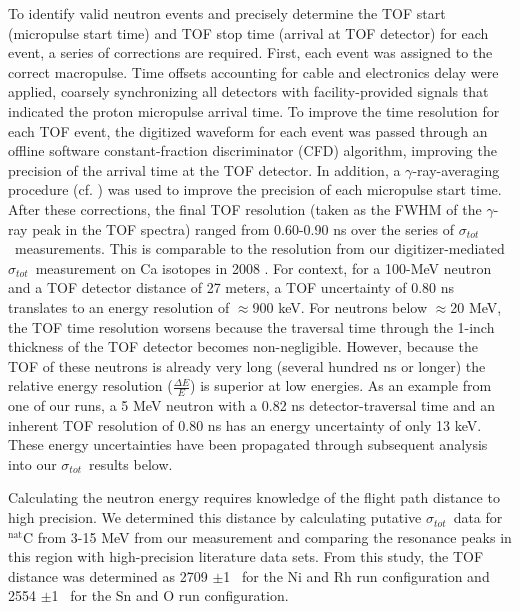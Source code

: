 \documentclass[twocolumn,secnumarabic,amssymb, nobibnotes, aps, prl,
superscriptaddress, nobalancelastpage]{revtex4}
\newcommand{\tot}{\ensuremath{\sigma_{tot}}}
\begin{document}
To identify valid neutron events and precisely determine the TOF start (micropulse start 
time) and TOF stop time (arrival at TOF detector) for each event, a series of corrections 
are required.  First, each event was assigned to the correct macropulse.
Time offsets accounting for cable and
electronics delay were applied, coarsely synchronizing all detectors with
facility-provided signals that indicated the proton micropulse arrival time.
To improve the time resolution for each TOF
event, the digitized waveform for each event was passed 
through an offline software constant-fraction discriminator (CFD) algorithm,
improving the precision of the arrival time at the TOF detector.
In addition, a $\gamma$-ray-averaging
procedure (cf. \cite{Shane2010}) was used to improve the precision of each
micropulse start time. After these corrections, the final TOF resolution
(taken as the FWHM of the $\gamma$-ray peak in the TOF spectra) ranged from
0.60-0.90 ns over the series of \tot\ measurements.
This is comparable to the resolution from 
our digitizer-mediated \tot\ measurement on Ca isotopes in 2008 \cite{Shane2010}.
For context, for a 100-MeV neutron and a TOF detector distance of 27 meters, a TOF 
uncertainty of 0.80 ns translates to an energy resolution of $\approx$900 keV.
For neutrons below $\approx$20 MeV, the TOF time resolution worsens because the traversal time 
through the 1-inch thickness of the TOF detector becomes non-negligible.
However, because the TOF of these neutrons is already very long (several hundred ns or
longer) the relative energy resolution ($\frac{\Delta E}{E}$) is
superior at low energies. As an example from one of our runs, a 5 MeV neutron with
a 0.82 ns detector-traversal time and an inherent TOF resolution of 0.80 ns
has an energy uncertainty of only 13 keV. These energy uncertainties
have been propagated through subsequent analysis into our \tot\ results below.

Calculating the neutron energy requires knowledge of the flight path
distance to high precision. We determined this distance by calculating 
putative \tot\ data for $^{\text{nat}}$C from 3-15 MeV from our measurement and 
comparing the resonance peaks in this region with high-precision literature data
sets. From this study, the TOF distance was determined as 2709 $\pm$1
\centi\meter\ for the Ni and Rh run configuration and 2554
$\pm$1 \centi\meter\ for the Sn and O run configuration.
\end{document}
